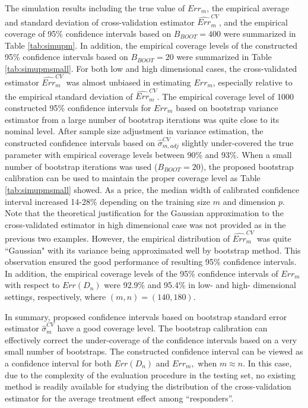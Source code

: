 \documentclass[12pt]{article}
\begin{document}
The simulation results including the true value of $Err_m$, the empirical average and standard deviation of cross-validation estimator $\widehat{Err}_m^{CV}$, and the empirical coverage of 95\% confidence intervals based on $B_{BOOT}=400$ were summarized in Table \ref{tab:simupm}.  In addition, the empirical coverage levels of the constructed 95\% confidence intervals based on $B_{BOOT}=20$ were summarized in Table \ref{tab:simupmsmall}.
For both low and high dimensional cases, the cross-validated estimator $\widehat{Err}^{CV}_m$ was almost unbiased in estimating $Err_m$, especially relative to the empirical standard deviation of $\widehat{Err}^{CV}_m$. The empirical coverage level of 1000 constructed 95\% confidence intervals for $Err_m$ based on bootstrap variance estimator from a large number of bootstrap iterations was quite close to its nominal level. After sample size adjustment in variance estimation, the constructed confidence intervals based on $\widehat{\sigma}_{m,adj}^{CV}$ slightly under-covered the true parameter with empirical coverage levels between 90\% and 93\%.  When a small number of bootstrap iterations was used ($B_{BOOT}=20$), the proposed bootstrap calibration can be used to maintain the proper coverage level as Table \ref{tab:simupmsmall} showed. As a price, the median width of calibrated confidence interval increased 14-28\% depending on the training size $m$ and dimension $p$. Note that the theoretical justification for the Gaussian approximation to the cross-validated estimator in high dimensional case was not provided as in the previous two examples. However, the empirical distribution of $\widehat{Err}^{CV}_m$ was quite ``Gaussian" with its variance being approximated well by bootstrap method. This observation ensured the good performance of resulting 95\% confidence intervals. In addition, the empirical coverage levels of the 95\% confidence intervals of $Err_{m}$ with respect to $Err(D_n)$ were 92.9\% and 95.4\% in low- and high- dimensional settings, respectively, where $(m, n)=(140, 180).$ 


In summary, proposed confidence intervals based on bootstrap standard error estimator $\widehat{\sigma}_m^{CV}$ have a good coverage level. The bootstrap calibration can effectively correct the under-coverage of the confidence intervals based on a very small number of bootstraps. The constructed confidence interval can be viewed as a confidence interval for both $Err(D_n)$ and $Err_m,$ when $m\approx n$. In this case, due to the complexity of the evaluation procedure in the testing set, no existing method is readily available for studying the distribution of the cross-validation estimator for the average treatment effect among ``responders''.    
\end{document}
